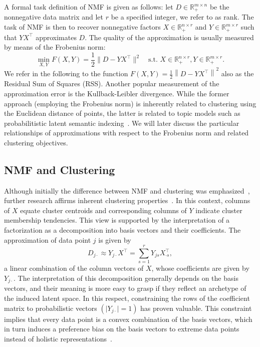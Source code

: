 A formal task definition of NMF is given as follows: let $D\in\mathbb{R}_+^{m\times n}$ be the nonnegative data matrix and let $r$ be a specified integer, we refer to as rank. The task of NMF is then to recover nonnegative factors $X\in \mathbb{R}_+^{n\times r}$ and $Y\in \mathbb{R}_+^{m\times r}$ such that $YX^\top$ approximates $D$. The quality of the approximation is usually measured by means of the Frobenius norm:
\begin{equation}
	\min_{X,Y} F(X,Y) = \frac{1}{2}\bigl\lVert D-YX^\top\bigr\rVert ^2 \quad \text{s.t. }X\in \mathbb{R}_+^{n\times r}, Y\in \mathbb{R}_+^{m\times r}.\label{eq:NMF} \tag{NMF}
\end{equation}
We refer in the following to the function $F(X,Y)=\frac{1}{2}\left\lVert D-YX^\top\right\rVert ^2$ also as the Residual Sum of Squares (RSS). Another popular measurement of the approximation error is the Kullback-Leibler divergence. While the former approach (employing the Frobenius norm) is inherently related to clustering using the Euclidean distance of points, the latter is related to topic models such as probabilitistic latent semantic indexing~\citep{gaussier2005relation,ding2006nonnegative}. We will later discuss the particular relationships of approximations with respect to the Frobenius norm and related clustering objectives. 
\subsection{NMF and Clustering} \label{sec:ZS:NMFClus}
Although initially the difference between NMF and clustering was emphasized~\citep{lee1999learning}, further research affirms inherent clustering properties~\citep{li2006relationships}. In this context, columns of $X$ equate cluster centroids and corresponding columns of $Y$ indicate cluster membership tendencies. This view is supported by the interpretation of a factorization as a decomposition into basis vectors and their coefficients. The approximation of data point $j$ is given by
\[D_{j\cdot}\approx Y_{j\cdot}X^\top=\sum_{s=1}^rY_{js}X_{\cdot s}^\top,\]
a linear combination of the column vectors of $X$, whose coefficients are given by $Y_{j\cdot}$. The interpretation of this decomposition generally depends on the basis vectors, and their meaning is more easy to grasp if they reflect an archetype of the induced latent space. In this respect, constraining the rows of the coefficient matrix to probabilistic vectors $(\lvert Y_{j\cdot}\rvert=1)$ has proven valuable. This constraint implies that every data point is a convex combination of the basis vectors, which in turn induces a preference bias on the basis vectors to extreme data points instead of holistic representations~\citep{thurau2012descriptive}.  

